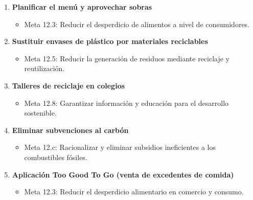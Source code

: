 


\begin{solution}


    \begin{enumerate}[label=\alph*)]
    \item \textbf{Planificar el menú y aprovechar sobras}  
    \begin{itemize}
        \item Meta 12.3: Reducir el desperdicio de alimentos a nivel de consumidores.
    \end{itemize}

    \item \textbf{Sustituir envases de plástico por materiales reciclables}  
    \begin{itemize}
        \item Meta 12.5: Reducir la generación de residuos mediante reciclaje y reutilización.
    \end{itemize}

    \item \textbf{Talleres de reciclaje en colegios}  
    \begin{itemize}
        \item Meta 12.8: Garantizar información y educación para el desarrollo sostenible.
    \end{itemize}

    \item \textbf{Eliminar subvenciones al carbón}  
    \begin{itemize}
        \item Meta 12.c: Racionalizar y eliminar subsidios ineficientes a los combustibles fósiles.
    \end{itemize}

    \item \textbf{Aplicación Too Good To Go (venta de excedentes de comida)}  
    \begin{itemize}
        \item Meta 12.3: Reducir el desperdicio alimentario en comercio y consumo.
    \end{itemize}
\end{enumerate}
\end{solution}
